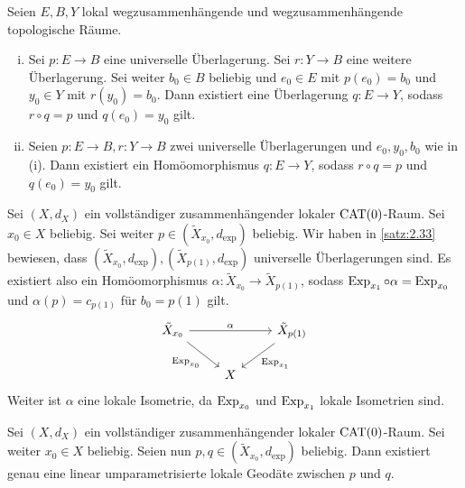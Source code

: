 \begin{bemerkung}
\label{bem:2.36}
	Seien $E,B,Y$ lokal wegzusammenhängende und wegzusammenhängende topologische Räume.
	\begin{enumerate}[(i)]
		\item Sei $p \colon E \rightarrow B$ eine universelle Überlagerung.
		Sei $r \colon Y \rightarrow B$ eine weitere Überlagerung.
		Sei weiter $b_0 \in B$ beliebig und $e_0 \in E$ mit $p(e_0) = b_0$ und $y_0 \in Y$ mit $r(y_0) = b_0$.
		Dann existiert eine Überlagerung $q \colon E \rightarrow Y$, sodass $r \circ q = p$ und $q(e_0) = y_0$ gilt.
		\item Seien $p\colon E \rightarrow B, r\colon Y \rightarrow B$ zwei universelle Überlagerungen und $e_0,y_0,b_0$ wie in (i).
		Dann existiert ein Homöomorphismus $q \colon E \rightarrow Y$, sodass $r \circ q = p$ und $q(e_0) = y_0$ gilt.
	\end{enumerate}
\end{bemerkung}

\begin{bemerkung}
\label{bem:2.37}
	Sei $(X,d_X)$ ein vollständiger zusammenhängender lokaler $\operatorname{CAT(0)}$-Raum.
	Sei $x_0 \in X$ beliebig.
	Sei weiter $p \in (\tilde{X}_{x_0},d_{\exp})$ beliebig.
	Wir haben in \autoref{satz:2.33} bewiesen, dass $(\tilde{X}_{x_0},d_{\exp}), (\tilde{X}_{p(1)},d_{\exp})$ universelle Überlagerungen sind.
	Es existiert also ein Homöomorphismus $\alpha \colon \tilde{X}_{x_0} \rightarrow \tilde{X}_{p(1)}$, sodass $\operatorname{Exp}_{x_1} \circ \alpha = \operatorname{Exp}_{x_0}$ und $\alpha(p) = c_{p(1)}$ für $b_0 = p(1)$ gilt.
	\[
		\begin{tikzcd}
			\tilde{X}_{x_0} \arrow{rr}{\alpha} \arrow{rd}[swap]{\Exp_{x_0}} & & \tilde{X}_{p(1)} \arrow{ld}{\Exp_{x_1}} \\
			& X & 
		\end{tikzcd}
	\]	
	Weiter ist $\alpha$ eine lokale Isometrie, da $\operatorname{Exp}_{x_0}$ und $\operatorname{Exp}_{x_1}$ lokale Isometrien sind.
\end{bemerkung}

\begin{lemma}
\label{lemma:2.38}
	Sei $(X,d_X)$ ein vollständiger zusammenhängender lokaler $\operatorname{CAT(0)}$-Raum.
	Sei weiter $x_0 \in X$ beliebig.
	Seien nun $p,q \in (\tilde{X}_{x_0},d_{\exp})$ beliebig.
	Dann existiert genau eine linear umparametrisierte lokale Geodäte zwischen $p$ und $q$.
\end{lemma}

\cleardoubleoddemptypage